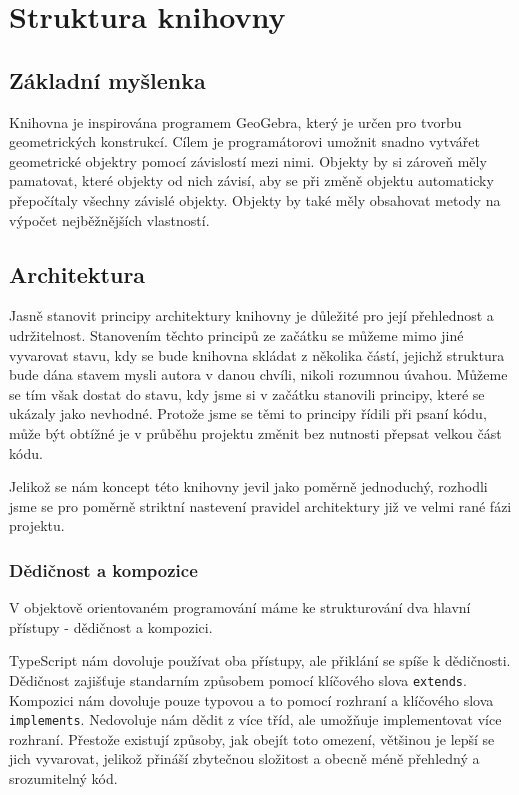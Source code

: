 \chapter{Struktura knihovny}
\label{chap:strucutre}

\section{Základní myšlenka}
\label{sec:basic-idea}

Knihovna je inspirována programem GeoGebra, který je určen pro tvorbu geometrických konstrukcí. 
Cílem je programátorovi umožnit snadno vytvářet geometrické objektry pomocí závislostí mezi nimi.
Objekty by si zároveň měly pamatovat, které objekty od nich závisí, aby se při změně objektu automaticky přepočítaly všechny závislé objekty.
Objekty by také měly obsahovat metody na výpočet nejběžnějších vlastností.

\section{Architektura}
\label{sec:architecture}

Jasně stanovit principy architektury knihovny je důležité pro její přehlednost a udržitelnost.
Stanovením těchto principů ze začátku se můžeme mimo jiné vyvarovat stavu, kdy se bude knihovna skládat z několika částí, jejichž struktura bude dána stavem mysli autora v danou chvíli, nikoli rozumnou úvahou.
Můžeme se tím však dostat do stavu, kdy jsme si v začátku stanovili principy, které se ukázaly jako nevhodné. 
Protože jsme se těmi to principy řídili při psaní kódu, může být obtížné je v průběhu projektu změnit bez nutnosti přepsat velkou část kódu.

Jelikož se nám koncept této knihovny jevil jako poměrně jednoduchý, rozhodli jsme se pro poměrně striktní nastevení pravidel architektury již ve velmi rané fázi projektu.

\subsection{Dědičnost a kompozice}
\label{subsec:inheritance-composition}

V objektově orientovaném programování máme ke strukturování dva hlavní přístupy - dědičnost a kompozici.

TypeScript nám dovoluje používat oba přístupy, ale přiklání se spíše k dědičnosti.
Dědičnost zajišťuje standarním způsobem pomocí klíčového slova \texttt{extends}.
Kompozici nám dovoluje pouze typovou a to pomocí rozhraní a klíčového slova \texttt{implements}.
Nedovoluje nám dědit z více tříd, ale umožňuje implementovat více rozhraní.
Přestože existují způsoby, jak obejít toto omezení, většinou je lepší se jich vyvarovat, jelikož přináší zbytečnou složitost a obecně méně přehledný a srozumitelný kód.

